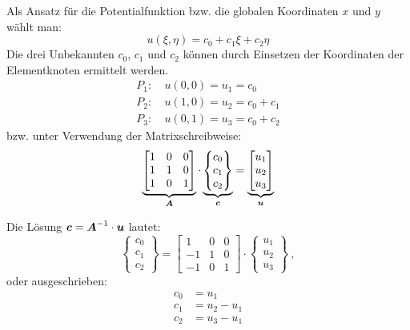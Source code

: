 Als Ansatz für die Potentialfunktion bzw. die globalen Koordinaten $x$ und $y$ wählt man:
\begin{equation}
 \label{eq:linear_triangle_eq}
u(\xi, \eta) = c_0 + c_1 \xi + c_2 \eta
\end{equation}
Die drei Unbekannten $c_0$, $c_1$ und $c_2$ können durch Einsetzen der Koordinaten der Elementknoten ermittelt werden. 
\begin{align}
P_1:&\ u(0,0) = u_1 = c_0\\
P_2:&\ u(1,0) = u_2 = c_0 + c_1 \nonumber \\
P_3:&\ u(0,1) = u_3 = c_0 + c_2 \nonumber
\end{align}
 bzw. unter Verwendung der Matrixschreibweise:
 \begin{equation}
 \label{eq:linear_triangle_matrix_eq}
 \underbrace{
 \begin{bmatrix}
 1 & 0 & 0 \\
 1 & 1 & 0 \\
 1 & 0 & 1
 \end{bmatrix}}_{\boldsymbol{A}} \cdot 
\underbrace{
 \begin{Bmatrix}
 c_0 \\ c_1 \\ c_2
 \end{Bmatrix}}_{\boldsymbol{c}} = 
\underbrace{
 \begin{bmatrix}
 u_1 \\ u_2 \\ u_3
 \end{bmatrix}}_{\boldsymbol{u}}
 \end{equation}
 
 Die Lösung $\boldsymbol{c} = \boldsymbol{A}^{-1}\cdot\boldsymbol{u}$ lautet:
 \begin{equation}
\begin{Bmatrix}
c_0 \\ c_1 \\ c_2
\end{Bmatrix} = 
\begin{bmatrix}
1 & 0 & 0 \\
-1 & 1 & 0 \\
-1 & 0 & 1
\end{bmatrix}
 \cdot 
 \begin{Bmatrix}
 	u_1 \\ u_2 \\ u_3
 \end{Bmatrix} \ ,
\end{equation}
oder ausgeschrieben:
\begin{align}
	c_0 &= u_1 \\
	c_1 &= u_2 - u_1 \nonumber\\
	c_2 &= u_3 - u_1 \nonumber
\end{align}

